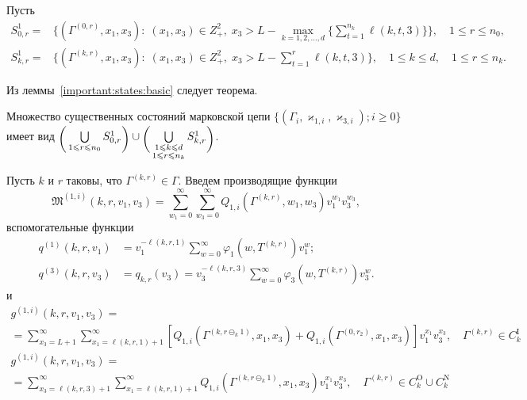 \documentclass[a4paper,12pt,russian]{extarticle}
\begin{document}
Пусть
\begin{align*}
  S^1_{0,r} = & 
  \biggl\{
  (\Gamma^{(0,r)},x_1, x_3) \colon \; (x_1, x_3)\in Z^2_+,\; x_3 > L - \max\limits_{k=1, 2,
    \ldots, d}
  \biggl\{ \sum_{t=1}^{n_k} \ell({k,t,3}) \biggl\}\biggl\}, 
  \quad 1 \leqslant r \leqslant n_0, \\
  S^1_{k,r} = & 
  \biggl\{
  (\Gamma^{(k,r)},x_1, x_3) \colon \; (x_1, x_3)\in Z^2_+,\; x_3 > L - \sum_{t=1}^{r} \ell({k,t,3})
  \biggr\}, 
  \quad 1 \leqslant k \leqslant d, \quad 1 \leqslant r \leqslant n_k.
\end{align*}

Из леммы~\ref{important:states:basic} следует теорема.
\begin{theorem}
Множество существенных состояний марковской цепи $\{(\Gamma_i, \varkappa_{1,i},\varkappa_{3,i}); i \geqslant 0\}$ имеет вид $\raisebox{-.5ex}{$\biggl($}\bigcup\limits_{1 \leqslant r \leqslant n_0}S^1_{0,r}\raisebox{-.5ex}{$\biggr)$}\cup \raisebox{-.5ex}{$\biggl($}\bigcup\limits_{\substack{1 \leqslant k \leqslant d\\ 1 \leqslant r \leqslant n_k}} S^1_{k,r}\raisebox{-.5ex}{$\biggr)$}$.
\end{theorem}

Пусть $k$ и $r$ таковы, что $\Gamma^{(k,r)}\in \Gamma$. Введем производящие функции
\begin{equation*}
\mathfrak{M}^{(1,i)}(k,r,v_1,v_3) = \sum_{w_1=0}^{\infty}\sum_{w_3=0}^{\infty} Q_{1,i}(\Gamma^{(k,r)},w_1,w_3) v_1^{w_1} v_3^{w_3},
\end{equation*}
вспомогательные функции
\begin{align*}
q^{(1)}(k,r, v_1) &= v_1^{-\ell(k,r,1)}\sum_{w=0}^{\infty} \varphi_1(w,T^{(k,r)})v_1^w;\\
q^{(3)}(k,r, v_3) &= q_{k,r} (v_3) = v_3^{-\ell(k,r,3)}\sum_{w=0}^{\infty} \varphi_3(w,T^{(k,r)})v_3^w.
\end{align*}
и 
\begin{multline*}
    g^{(1,i)}(k,r,v_1,v_3) =\\
    =\sum_{x_3=L+1}^{\infty} \sum_{x_1=\ell(k,r,1)+1}^{\infty}  [  Q_{1,i}(\Gamma^{(k, r\ominus_{k}1)},x_1, x_3) +Q_{1,i}(\Gamma^{(0, r_2)},x_1, x_3)]v_1^{x_1} v_3^{ x_3}, \quad \Gamma^{(k,r)} \in C_{k}^{\mathrm{I}}
\end{multline*}
\begin{multline*}
    g^{(1,i)}(k,r,v_1,v_3) =\\
    =\sum_{x_3=\ell(k,r,3)+1}^{\infty} \sum_{x_1=\ell(k,r,1)+1}^{\infty} Q_{1,i}(\Gamma^{(k, r\ominus_{k}1)},x_1, x_3) v_1^{x_1} v_3^{ x_3}, \quad \Gamma^{(k,r)} \in C_{k}^{\mathrm{O}} \cup C_{k}^{\mathrm{N}}
\end{multline*}
\end{document}
